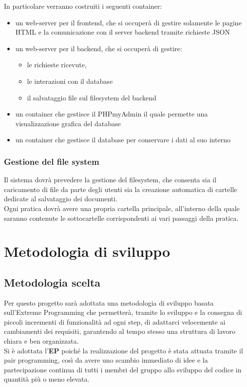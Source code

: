 \documentclass{article}
\begin{document}
In particolare verranno costruiti i seguenti container:
\begin{itemize}
    \item un web-server per il frontend, che si occuperà di gestire solamente le pagine HTML e la comunicazione con il server backend tramite richieste JSON
    \item un web-server per il backend, che si occuperà di gestire:
        \begin{itemize}
            \item le richieste ricevute,
            \item le interazioni con il database
            \item il salvataggio file sul filesystem del backend
        \end{itemize}
    \item un container che gestisce il PHPmyAdmin il quale permette una visualizzazione grafica del database
    \item un container che gestisce il database per conservare i dati al suo interno
\end{itemize}

\subsubsection{Gestione del file system}
Il sistema dovrà prevedere la gestione del filesystem, che consenta sia il caricamento di file da parte degli utenti sia la creazione automatica di cartelle dedicate al salvataggio dei documenti.\\
Ogni pratica dovrà avere una propria cartella principale, all'interno della quale saranno contenute le sottocartelle corrispondenti ai vari passaggi della pratica.

\section{Metodologia di sviluppo}
\subsection{Metodologia scelta}
Per questo progetto sarà adottata una metodologia di sviluppo basata sull'Extreme Programming che permetterà, tramite lo sviluppo e la consegna di piccoli incrementi di funzionalità ad ogni step, di adattarci velocemente ai cambiamenti dei requisiti, garantendo al tempo stesso una struttura di lavoro chiara e ben organizzata.\\
Si è adottata l'\textbf{EP} poiché la realizzazione del progetto è stata attuata tramite il pair programming, così da avere uno scambio immediato di idee e la partecipazione continua di tutti i membri del gruppo allo sviluppo del codice in quantità più o meno elevata.
\end{document}
